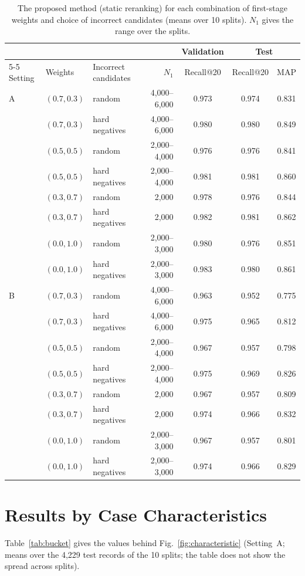 \begin{table}[h]\centering
\caption{The proposed method (static reranking) for each combination of first-stage weights and
choice of incorrect candidates (means over 10 splits). $N_1$ gives the range over the splits.}
\label{tab:stage1grid}
\footnotesize
\setlength{\tabcolsep}{3pt}
\begin{tabular}{@{}lllrccc@{}}
\toprule
 & & & & Validation & \multicolumn{2}{c}{Test} \\
\cmidrule{5-5}\cmidrule{6-7}
Setting & Weights & Incorrect candidates & $N_1$ & Recall@20 & Recall@20 & MAP \\
\midrule
A & $(0.7, 0.3)$ & random & 4,000--6,000 & 0.973 & 0.974 & 0.831 \\
 & $(0.7, 0.3)$ & hard negatives & 4,000--6,000 & 0.980 & 0.980 & 0.849 \\
 & $(0.5, 0.5)$ & random & 2,000--4,000 & 0.976 & 0.976 & 0.841 \\
 & $(0.5, 0.5)$ & hard negatives & 2,000--4,000 & 0.981 & 0.981 & 0.860 \\
 & $(0.3, 0.7)$ & random & 2,000 & 0.978 & 0.976 & 0.844 \\
 & $(0.3, 0.7)$ & hard negatives & 2,000 & 0.982 & 0.981 & 0.862 \\
 & $(0.0, 1.0)$ & random & 2,000--3,000 & 0.980 & 0.976 & 0.851 \\
 & $(0.0, 1.0)$ & hard negatives & 2,000--3,000 & 0.983 & 0.980 & 0.861 \\
\midrule
B & $(0.7, 0.3)$ & random & 4,000--6,000 & 0.963 & 0.952 & 0.775 \\
 & $(0.7, 0.3)$ & hard negatives & 4,000--6,000 & 0.975 & 0.965 & 0.812 \\
 & $(0.5, 0.5)$ & random & 2,000--4,000 & 0.967 & 0.957 & 0.798 \\
 & $(0.5, 0.5)$ & hard negatives & 2,000--4,000 & 0.975 & 0.969 & 0.826 \\
 & $(0.3, 0.7)$ & random & 2,000 & 0.967 & 0.957 & 0.809 \\
 & $(0.3, 0.7)$ & hard negatives & 2,000 & 0.974 & 0.966 & 0.832 \\
 & $(0.0, 1.0)$ & random & 2,000--3,000 & 0.967 & 0.957 & 0.801 \\
 & $(0.0, 1.0)$ & hard negatives & 2,000--3,000 & 0.974 & 0.966 & 0.829 \\
\bottomrule
\end{tabular}
\end{table}

\section{Results by Case Characteristics}
\label{app:bucket}
Table~\ref{tab:bucket} gives the values behind Fig.~\ref{fig:characteristic} (Setting~A; means
over the 4,229 test records of the 10 splits; the table does not show the spread across splits).

